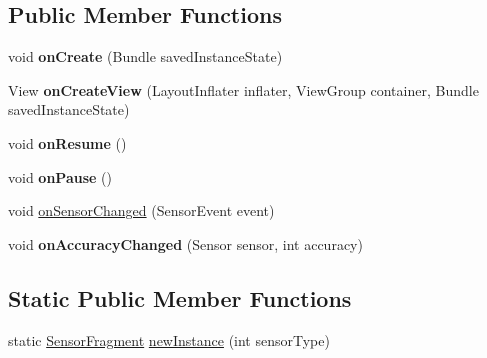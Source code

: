 \subsection*{Public Member Functions}
\begin{DoxyCompactItemize}
\item 
void {\bfseries on\+Create} (Bundle saved\+Instance\+State)\hypertarget{classcom_1_1example_1_1android_1_1wearable_1_1wcldemo_1_1SensorFragment_affa2193a68b749aa22176e445bac9d8f}{}\label{classcom_1_1example_1_1android_1_1wearable_1_1wcldemo_1_1SensorFragment_affa2193a68b749aa22176e445bac9d8f}

\item 
View {\bfseries on\+Create\+View} (Layout\+Inflater inflater, View\+Group container, Bundle saved\+Instance\+State)\hypertarget{classcom_1_1example_1_1android_1_1wearable_1_1wcldemo_1_1SensorFragment_ac12d5223603b272e91b903565c98f3f2}{}\label{classcom_1_1example_1_1android_1_1wearable_1_1wcldemo_1_1SensorFragment_ac12d5223603b272e91b903565c98f3f2}

\item 
void {\bfseries on\+Resume} ()\hypertarget{classcom_1_1example_1_1android_1_1wearable_1_1wcldemo_1_1SensorFragment_aa53ca3f775c74c5ccd1c99c6ecca0858}{}\label{classcom_1_1example_1_1android_1_1wearable_1_1wcldemo_1_1SensorFragment_aa53ca3f775c74c5ccd1c99c6ecca0858}

\item 
void {\bfseries on\+Pause} ()\hypertarget{classcom_1_1example_1_1android_1_1wearable_1_1wcldemo_1_1SensorFragment_ab7c57f9d0b2eba0be643161eaa6c9837}{}\label{classcom_1_1example_1_1android_1_1wearable_1_1wcldemo_1_1SensorFragment_ab7c57f9d0b2eba0be643161eaa6c9837}

\item 
void \hyperlink{classcom_1_1example_1_1android_1_1wearable_1_1wcldemo_1_1SensorFragment_a2b78935dbfb254d4165468feda4ec44d}{on\+Sensor\+Changed} (Sensor\+Event event)
\item 
void {\bfseries on\+Accuracy\+Changed} (Sensor sensor, int accuracy)\hypertarget{classcom_1_1example_1_1android_1_1wearable_1_1wcldemo_1_1SensorFragment_a312e22f63a424fcb284ee6c6fc4f35c1}{}\label{classcom_1_1example_1_1android_1_1wearable_1_1wcldemo_1_1SensorFragment_a312e22f63a424fcb284ee6c6fc4f35c1}

\end{DoxyCompactItemize}
\subsection*{Static Public Member Functions}
\begin{DoxyCompactItemize}
\item 
static \hyperlink{classcom_1_1example_1_1android_1_1wearable_1_1wcldemo_1_1SensorFragment}{Sensor\+Fragment} \hyperlink{classcom_1_1example_1_1android_1_1wearable_1_1wcldemo_1_1SensorFragment_a05ddd04f93e04dcf87893f6d1e46edde}{new\+Instance} (int sensor\+Type)
\end{DoxyCompactItemize}


